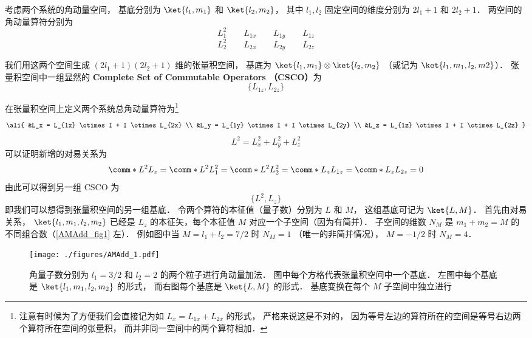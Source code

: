 

考虑两个系统的角动量空间， 基底分别为 $\ket{l_1, m_1}$ 和 $\ket{l_2, m_2}$， 其中 $l_1, l_2$ 固定空间的维度分别为 $2l_1+1$ 和 $2l_2+1$． 两空间的角动量算符分别为
\begin{equation}\label{AMAdd_eq1}
L_1^2 \qquad L_{1x} \qquad L_{1y} \qquad L_{1z}
\end{equation}
\begin{equation}
L_2^2 \qquad L_{2x} \qquad L_{2y} \qquad L_{2z}
\end{equation}

我们用这两个空间生成 $(2l_1+1)(2l_2+1)$ 维的张量积空间， 基底为 $\ket{l_1, m_1}\otimes\ket{l_2, m_2}$ （或记为 $\ket{l_1, m_1, l_2, m2}$）． 张量积空间中一组显然的 \textbf{Complete Set of Commutable Operators （CSCO）}为 %
\begin{equation}
\{L_{1z}, L_{2z}\}
\end{equation}

在张量积空间上定义两个系统总角动量算符为\footnote{注意有时候为了方便我们会直接记为如 $L_x = L_{1x} + L_{2x}$ 的形式， 严格来说这是不对的， 因为等号左边的算符所在的空间是等号右边两个算符所在空间的张量积， 而并非同一空间中的两个算符相加．}
\begin{equation}\ali{
&L_x = L_{1x} \otimes I +  I \otimes L_{2x} \\
&L_y = L_{1y} \otimes I +  I \otimes L_{2y} \\
&L_z = L_{1z} \otimes I +  I \otimes L_{2z}
}\end{equation}
\begin{equation}
L^2 = L_x^2 + L_y^2 + L_z^2
\end{equation}
可以证明新增的对易关系为
\begin{equation}
\comm*{L^2}{L_z} = \comm*{L^2}{L_1^2} = \comm*{L^2}{L_2^2} = 
\comm*{L_z}{L_{1z}} = \comm*{L_z}{L_{2z}} = 0
\end{equation}
由此可以得到另一组 CSCO 为 %
\begin{equation}
\{L^2, L_z\}
\end{equation}
即我们可以想得到张量积空间的另一组基底． 令两个算符的本征值（量子数）分别为 $L$  和 $M$， 这组基底可记为 $\ket{L, M}$．  首先由对易关系， $\ket{l_1, m_1, l_2, m_2}$ 已经是 $L_z$ 的本征矢，每个本征值 $M$ 对应一个子空间（因为有简并）． 子空间的维数 $N_M$ 是 $m_1 + m_2 = M$ 的不同组合数（\autoref{AMAdd_fig1} 左）． 例如图中当 $M = l_1 + l_2 = 7/2$ 时 $N_M = 1$ （唯一的非简并情况）， $M = -1/2$ 时 $N_M = 4$．
\begin{figure}[ht]
\centering
\texttt{[image: ./figures/AMAdd\_1.pdf]}
\caption{角量子数分别为 $l_1 = 3/2$ 和 $l_2 = 2$ 的两个粒子进行角动量加法． 图中每个方格代表张量积空间中一个基底． 左图中每个基底是 $\ket{l_1, m_1, l_2, m_2}$ 的形式， 而右图每个基底是 $\ket{L, M}$ 的形式． 基底变换在每个 $M$ 子空间中独立进行} \label{AMAdd_fig1}
\end{figure}

